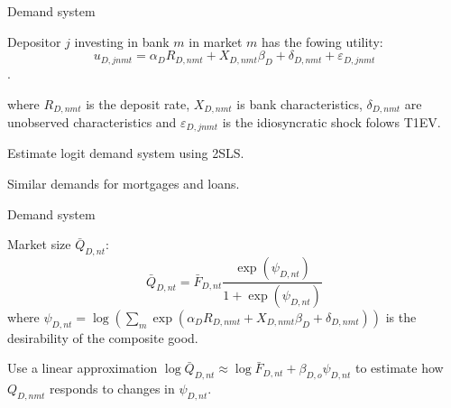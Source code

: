 \documentclass[notes,11pt, aspectratio=169]{beamer}
\newenvironment{wideitemize}{\itemize\addtolength{\itemsep}{10pt}}{\enditemize}
\begin{document}
\begin{frame}{Demand system}
    \vspace{0.2cm}
    \begin{wideitemize}
    \item Depositor $j$ investing in bank $m$ in market $m$ has the fowing utility:
    $$u_{D, j n m t}=\alpha_D R_{D, n m t}+X_{D, n m t} \beta_D+\delta_{D, n m t}+\varepsilon_{D, j n m t}$$.

    where $R_{D, n m t}$ is the deposit rate, $X_{D, n m t}$ is bank characteristics, $\delta_{D, n m t}$ are unobserved characteristics and $\varepsilon_{D, j n m t}$ is the idiosyncratic shock folows T1EV. 



         \item Estimate logit demand system using 2SLS. \\%
 \item Similar demands for mortgages and loans.

\end{wideitemize}

\end{frame}

\begin{frame}{Demand system}
    \vspace{0.2cm}
    \begin{wideitemize}

\item Market size $\bar{Q}_{D, n t}$:
$$
\bar{Q}_{D, n t}=\bar{F}_{D, n t} \frac{\exp \left(\psi_{D, n t}\right)}{1+\exp \left(\psi_{D, n t}\right)}
$$
 where $\psi_{D, n t}=\log \left(\sum_m \exp \left(\alpha_D R_{D, n m t}+X_{D, n m t} \beta_D+\delta_{D, n m t}\right)\right)$ is the desirability of the composite good.
\item Use a linear approximation $\log \bar{Q}_{D, n t} \approx \log \bar{F}_{D, n t}+\beta_{D, o} \psi_{D, n t}$ to estimate how $Q_{D, n m t}$ responds to changes in $\psi_{D, n t}$.

\end{wideitemize}

\end{frame}
\end{document}
